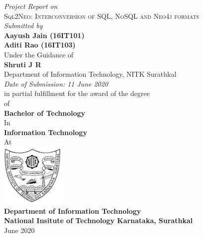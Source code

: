 \documentclass[12pt]{article}
\begin{document}
    \thispagestyle{empty}
    \begin{center}
        \textit{Project Report on}\\
        \vspace{2mm}
        \Large{\textsc{Sql2Neo: Interconversion of SQL, NoSQL and Neo4j formats}}\\
        \vspace{3mm}
        \textit{Submitted by}\\
        \large{\textbf{
            Aayush Jain (16IT101)\\
            Aditi Rao (16IT103)
        }}\\
        \vspace{4mm}
        Under the Guidance of\\
        \textbf{Shruti J R}\\
        Department of Information Technology, NITK Surathkal\\
        \vspace{4mm}
        \textit{Date of Submission: 11 June 2020}\\
        \vspace{4mm}
        in partial fulfillment for the award of the degree\\
        of\\
        \textbf{Bachelor of Technology}\\
        In\\
        \textbf{Information Technology}\\
        At
        \vspace{4mm}\\
        \includegraphics[width=1.2in,height=1.2in]{img/nitk.jpg}\\
        \textbf{Department of Information Technology}\\
        \textbf{National Insitute of Technology Karnataka, Surathkal}\\
        June 2020
    \end{center}

    \newpage
\end{document}
